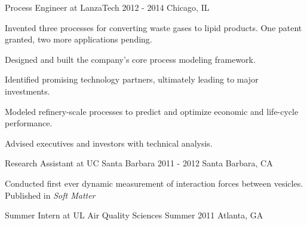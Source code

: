 \begin{cventries}
  \cventrynew
    {Process Engineer at LanzaTech} 
    {2012 - 2014} 
    {Chicago, IL} 
    {
      \begin{cvitems} %
        \item {Invented three processes for converting waste gases to lipid products. One patent granted, two more applications pending.}
		\item {Designed and built the company's core process modeling framework.}        
		\item {Identified promising technology partners, ultimately leading to major investments.}
        \item {Modeled refinery-scale processes to predict and optimize economic and life-cycle performance.}        
        \item {Advised executives and investors with technical analysis.}
      \end{cvitems}
    }
    
  \cventryshort
    {Research Assistant at UC Santa Barbara}
    {2011 - 2012}
    {Santa Barbara, CA}         
    {
      \begin{cvitems} %
        \item {Conducted first ever dynamic measurement of interaction forces between vesicles. Published in \emph{Soft Matter}}        
      \end{cvitems}
    }   
  
   \cventryshort
	{Summer Intern at UL Air Quality Sciences}    
    {Summer 2011}
    {Atlanta, GA}
    {}



\end{cventries}
